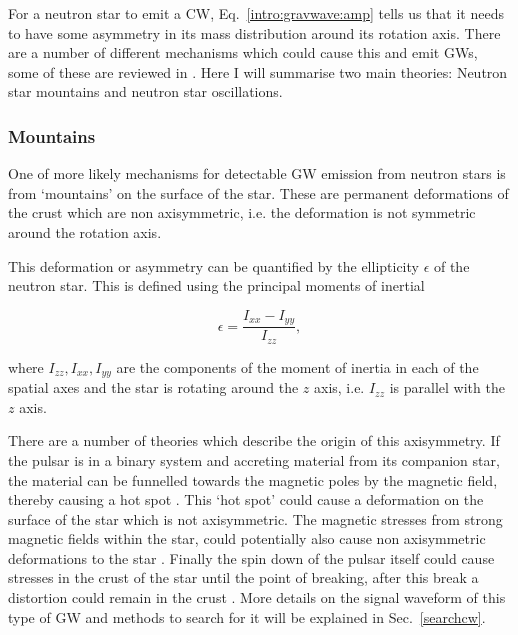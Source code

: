 For a neutron star to emit a \gls{CW}, Eq.~\ref{intro:gravwave:amp} tells us that it needs to have some asymmetry in its mass distribution around its rotation axis.  There are a number of different mechanisms which
could cause this and emit \glspl{GW}, some of these are reviewed in
\citep{glampedakis2017GravitationalWaves,riles2017RecentSearches,haskell2015DetectingGravitational,lasky2015GravitationalWaves}.
Here I will summarise two main theories: Neutron star mountains and neutron
star oscillations.

\subsubsection{\label{intro:source:cw:mountain}Mountains}

One of more likely mechanisms for detectable \gls{GW} emission from neutron
stars is from `mountains' on the surface of the star.  These are permanent
deformations of the crust which are non axisymmetric, i.e. the deformation is
not symmetric around the rotation axis.

This deformation or asymmetry can be quantified by the ellipticity $\epsilon$ of the neutron star.
This is defined using the principal moments of inertial

\begin{equation}
\label{intro:source:cw:ellipticity}
\epsilon = \frac{I_{xx}-I_{yy}}{I_{zz}},
\end{equation}

where $I_{zz},I_{xx},I_{yy}$ are the components of the moment of inertia in each of the spatial axes and the star is rotating around the $z$ axis, i.e. $I_{zz}$ is parallel with the $z$ axis.

There are a number of theories which describe the origin of this axisymmetry.
If the pulsar is in a binary system and accreting material from its companion
star, the material can be funnelled towards the magnetic poles by the magnetic
field, thereby causing a hot spot \citep{haskell2015DetectingGravitational}.
This `hot spot' could cause a deformation on the surface of the star which is
not axisymmetric.  The magnetic stresses from strong magnetic fields within the
star, could potentially also cause non axisymmetric deformations to the star
\citep{cutler2002GravitationalWaves}. Finally
the spin down of the pulsar itself could cause stresses in the crust of the
star until the point of breaking, after this break a
distortion could remain in the crust \citep{becker2009NeutronStars} .  
More details on the signal waveform of this type of \gls{GW} and methods to search for it will be explained in Sec.~\ref{searchcw}.
 
